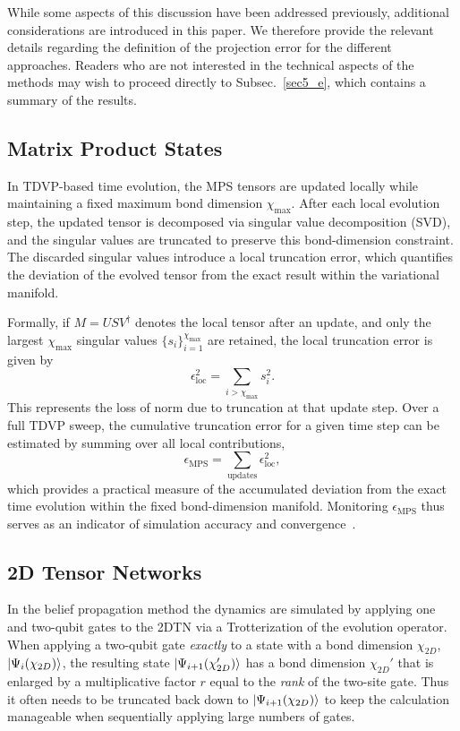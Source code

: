 \documentclass[aps,pra,reprint,amssymb,superscriptaddress]{revtex4-2}
\begin{document}
While some aspects of this discussion have been addressed previously, additional considerations are introduced in this paper. 
We therefore provide the relevant details regarding the definition of the projection error for the different approaches. 
Readers who are not interested in the technical aspects of the methods may wish to proceed directly to Subsec.~\ref{sec5_e}, which contains a summary of the results.

\subsection{Matrix Product States}
In TDVP-based time evolution, the MPS tensors are updated locally while maintaining a fixed maximum bond dimension \(\chi_{\text{max}}\). After each local evolution step, the updated tensor is decomposed via singular value decomposition (SVD), and the singular values are truncated to preserve this bond-dimension constraint. The discarded singular values introduce a local truncation error, which quantifies the deviation of the evolved tensor from the exact result within the variational manifold.

Formally, if \(M = U S V^\dagger\) denotes the local tensor after an update, and only the largest \(\chi_{\text{max}}\) singular values \(\{ s_i \}_{i=1}^{\chi_{\text{max}}}\) are retained, the local truncation error is given by
\begin{equation}
\epsilon_{\text{loc}}^2 = \sum_{i > \chi_{\text{max}}} s_i^2 .
\end{equation}
This represents the loss of norm due to truncation at that update step. Over a full TDVP sweep, the cumulative truncation error for a given time step can be estimated by summing over all local contributions,
\begin{equation}\label{eq:mps_error}
\epsilon_{\text{MPS}} = \sum_{\text{updates}} \epsilon_{\text{loc}}^2 ,
\end{equation}
which provides a practical measure of the accumulated deviation from the exact time evolution within the fixed bond-dimension manifold. Monitoring \(\epsilon_{\text{MPS}}\) thus serves as an indicator of simulation accuracy and convergence~\cite{paeckel_time-evolution_2019, kloss_time-dependent_2018}.

\subsection{2D Tensor Networks}

In the belief propagation method the dynamics are simulated by applying one and two-qubit gates to the 2DTN via a Trotterization of the  evolution operator. When applying a two-qubit gate \textit{exactly} to a state with a bond dimension $\chi_{2D}$, $\ket{\Psi_i(\chi_{2D})}$, the resulting state $\ket{\Psi_{i+1}(\chi_{2D}')}$ has a bond dimension $\chi_{2D}'$ that is enlarged by a multiplicative factor $r$ equal to the \textit{rank} of the two-site gate. Thus it often needs to be truncated back down to $\ket{\Psi_{i+1}(\chi_{2D})}$ to keep the calculation manageable when sequentially applying large numbers of gates.
\end{document}
